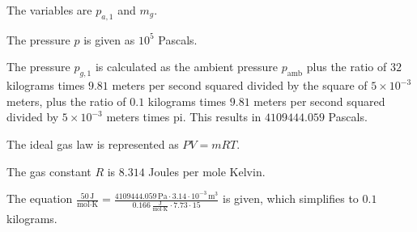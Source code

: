 The variables are \( p_{a,1} \) and \( m_g \).

The pressure \( p \) is given as \( 10^5 \) Pascals.

The pressure \( p_{g,1} \) is calculated as the ambient pressure \( p_{\text{amb}} \) plus the ratio of \( 32 \) kilograms times \( 9.81 \) meters per second squared divided by the square of \( 5 \times 10^{-3} \) meters, plus the ratio of \( 0.1 \) kilograms times \( 9.81 \) meters per second squared divided by \( 5 \times 10^{-3} \) meters times pi. This results in \( 4109444.059 \) Pascals.

The ideal gas law is represented as \( PV = mRT \).

The gas constant \( R \) is \( 8.314 \) Joules per mole Kelvin.

The equation \( \frac{50 \, \text{J}}{\text{mol} \cdot \text{K}} = \frac{4109444.059 \, \text{Pa} \cdot 3.14 \cdot 10^{-3} \, \text{m}^3}{0.166 \, \frac{\text{J}}{\text{mol} \cdot \text{K}} \cdot 7.73 \cdot 15} \) is given, which simplifies to \( 0.1 \) kilograms.